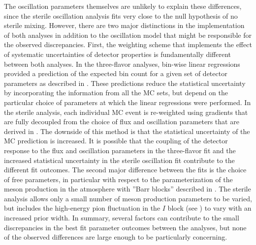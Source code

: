 The oscillation parameters themselves are unlikely to explain these differences, since the sterile oscillation analysis fits very close to the null hypothesis of no sterile mixing.
However, there are two major distinctions in the implementation of both analyses in addition to the oscillation model that might be responsible for the observed discrepancies.
First, the weighting scheme that implements the effect of systematic uncertainties of detector properties is fundamentally different between both analyses.
In the three-flavor analyses, bin-wise linear regressions provided a prediction of the expected bin count for a given set of detector parameters as described in .
These predictions reduce the statistical uncertainty by incorporating the information from all the MC sets, but depend on the particular choice of parameters at which the linear regressions were performed.
In the sterile analysis, each individual MC event is re-weighted using gradients that are fully decoupled from the choice of flux and oscillation parameters that are derived in .
The downside of this method is that the statistical uncertainty of the MC prediction is increased.
It is possible that the coupling of the detector response to the flux and oscillation parameters in the three-flavor fit and the increased statistical uncertainty in the sterile oscillation fit contribute to the different fit outcomes.
The second major difference between the fits is the choice of free parameters, in particular with respect to the parameterization of the meson production in the atmosphere with ''Barr blocks'' described in .
The sterile analysis allows only a small number of meson production parameters to be varied, but includes the high-energy pion fluctuation in the $I$ block (see ) to vary with an increased prior width.
In summary, several factors can contribute to the small discrepancies in the best fit parameter outcomes between the analyses, but none of the observed differences are large enough to be particularly concerning.

